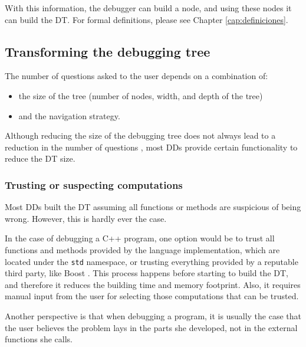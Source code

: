 With this information, the debugger can build a node, and using these nodes it can build the DT.
%
For formal definitions, please see Chapter \ref{cap:definiciones}.

\subsection{Transforming the debugging tree}

The number of questions asked to the user depends on a combination of:
\begin{itemize}
    \item the size of the tree (number of nodes, width, and depth of the tree) 
    \item and the navigation strategy.
\end{itemize}
Although reducing the size of the debugging tree does not always lead to a reduction in the number of questions \cite{LoopExpansionTreeCompression}, most DDs provide certain functionality to reduce the DT size.

\subsubsection{Trusting or suspecting computations}

Most DDs built the DT assuming all functions or methods are suspicious of being wrong.
However, this is hardly ever the case.

In the case of debugging a C++ program, one option would be to trust all functions and methods provided by the language implementation, which are located under the \verb|std| namespace, or trusting everything provided by a reputable third party, like Boost \cite{TheBoostLibraries}.
This process happens before starting to build the DT, and therefore it reduces the building time and memory footprint. Also, it requires manual input from the user for selecting those computations that can be trusted.

Another perspective is that when debugging a program, it is usually the case that the user believes the problem lays in the parts she developed, not in the external functions she calls.

